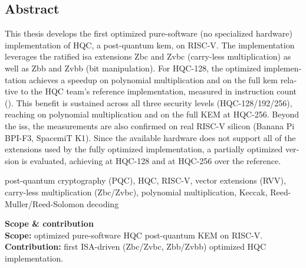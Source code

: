 \begin{english}
\chapter*{Abstract}

This thesis develops the first optimized pure-software (no specialized 
hardware) implementation of HQC, a post-quantum \gls{kem}, on RISC-V. 
The implementation leverages the ratified \gls{isa} extensions
Zbc and Zvbc (carry-less multiplication) as well as Zbb and Zvbb (bit 
manipulation). For HQC-128, the optimized implementation achieves a 
 speedup on polynomial multiplication and  
on the full \gls{kem} relative to the HQC team's reference implementation, 
measured in instruction count (\instret). This benefit is sustained 
across all three security levels (HQC-128/192/256), reaching  
on polynomial multiplication and  on the full KEM at HQC-256. 
Beyond the \gls{iss}, the measurements are also confirmed on real RISC-V
silicon (Banana Pi BPI-F3, SpacemiT K1). Since the available hardware does not
support all of the extensions used by the fully optimized implementation, a
partially optimized version is evaluated, achieving  at HQC-128 and
 at HQC-256 over the reference.

\begin{thesiskeywords}
  post-quantum cryptography (PQC),\; HQC,\; RISC-V,\;
  vector extensions (RVV),\; carry-less multiplication (Zbc/Zvbc),\;
  polynomial multiplication,\; Keccak,\; Reed-Muller/Reed-Solomon decoding
\end{thesiskeywords}

\begin{thesisscope}
\textbf{Scope \& contribution}\\[0.35em]
\textbf{Scope:} optimized pure-software HQC post-quantum KEM on RISC-V.\\
\textbf{Contribution:} first ISA-driven (Zbc/Zvbc, Zbb/Zvbb) optimized HQC implementation.
\end{thesisscope}

\vspace{1em}
\thesismetabox

\end{english}
